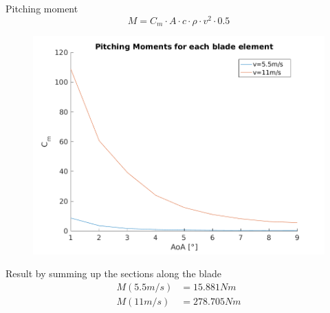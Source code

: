 \documentclass[12pt,t]{beamer}
\begin{document}
\begin{frame}
\huge
Pitching moment
\normalsize
\begin{equation*}
M= C_m \cdot A \cdot c \cdot \rho \cdot v^2 \cdot 0.5
\end{equation*}
\begin{figure}[H]
\centering
\includegraphics[width=0.5\linewidth]{../CIP_2/Figures/pitchingperbe.png}
\end{figure}
Result by summing up the sections along the blade
\begin{align*}
M(5.5m/s) &= 15.881 Nm\\
M(11m/s) &= 278.705 Nm
\end{align*}
\end{frame}
\end{document}
